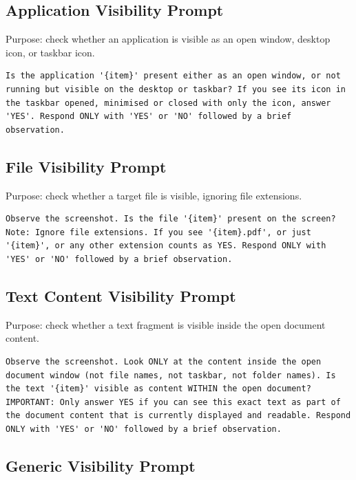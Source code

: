 \subsection{Application Visibility Prompt}

Purpose: check whether an application is visible as an open window, desktop icon, or taskbar icon.

\begin{lstlisting}
Is the application '{item}' present either as an open window, or not running but visible on the desktop or taskbar? If you see its icon in the taskbar opened, minimised or closed with only the icon, answer 'YES'. Respond ONLY with 'YES' or 'NO' followed by a brief observation.
\end{lstlisting}

\subsection{File Visibility Prompt}

Purpose: check whether a target file is visible, ignoring file extensions.

\begin{lstlisting}
Observe the screenshot. Is the file '{item}' present on the screen? Note: Ignore file extensions. If you see '{item}.pdf', or just '{item}', or any other extension counts as YES. Respond ONLY with 'YES' or 'NO' followed by a brief observation.
\end{lstlisting}

\subsection{Text Content Visibility Prompt}

Purpose: check whether a text fragment is visible inside the open document content.

\begin{lstlisting}
Observe the screenshot. Look ONLY at the content inside the open document window (not file names, not taskbar, not folder names). Is the text '{item}' visible as content WITHIN the open document? IMPORTANT: Only answer YES if you can see this exact text as part of the document content that is currently displayed and readable. Respond ONLY with 'YES' or 'NO' followed by a brief observation.
\end{lstlisting}

\subsection{Generic Visibility Prompt}


